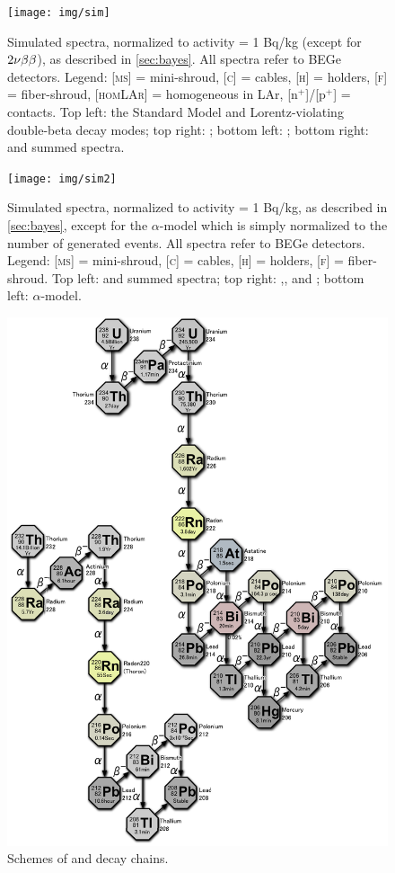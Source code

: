 \begin{landscape}
\begin{figure}
	\texttt{[image: img/sim]}
	\caption{Simulated spectra, normalized to activity = 1 Bq/kg (except for $2\nu\beta\beta$), as described in \cref{sec:bayes}. All spectra refer to BEGe detectors. Legend: \textsc{[ms]} = mini-shroud, \textsc{[c]} = cables, \textsc{[h]} = holders, \textsc{[f]} = fiber-shroud, \textsc{[homLAr]} = homogeneous in LAr, {[n$^+$]}/{[p$^+$]} = contacts. Top left: the Standard Model and Lorentz-violating double-beta decay modes; top right: ; bottom left: ; bottom right:  and  summed spectra.}
	\label{fig:simspectra}
\end{figure}
\end{landscape}
\begin{landscape}
\begin{figure}
	\texttt{[image: img/sim2]}
	\caption{Simulated spectra, normalized to activity = 1 Bq/kg, as described in \cref{sec:bayes}, except for the $\alpha$-model which is simply normalized to the number of generated events. All spectra refer to BEGe detectors. Legend: \textsc{[ms]} = mini-shroud, \textsc{[c]} = cables, \textsc{[h]} = holders, \textsc{[f]} = fiber-shroud. Top left:  and  summed spectra; top right: ,, and ; bottom left: $\alpha$-model.}
	\label{fig:simspectra2}
\end{figure}
\end{landscape}
	\begin{figure}
		\centerline{%
			\includegraphics[width=\linewidth]{img/chains.png}
		}
		\caption{Schemes of  and  decay chains.}\label{fig:chains}
	\end{figure}
\restoregeometry
